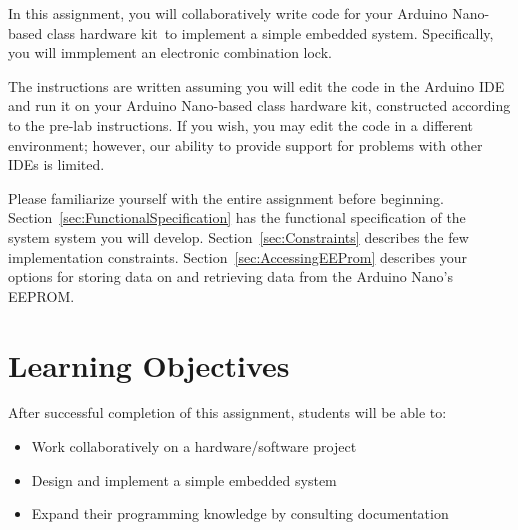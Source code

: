 

\usepackage{enumitem}
\usepackage{addfont}




\renewcommand{\labnumber}{10}
\renewcommand{\labname}{Implementing an Electronic Combination Lock}
\renewcommand{\shortlabname}{combolock -- grouplab}
\renewcommand{\collaborationrules}{\teameffort}
\renewcommand{\duedate}{Week of May 2, Before the start of your lab section\footnote{See Piazza for the due dates of teams with students from different lab sections.}}
\newcommand{\nano}{Arduino Nano}
\renewcommand{\runtimeenvironment}{your \nano-based class hardware kit}

\startdocument

In this assignment, you will collaboratively write code for \runtimeenvironment\
to implement a simple embedded system. Specifically, you will immplement an
electronic combination lock.

The instructions are written assuming you will edit the code in the Arduino IDE
and run it on \runtimeenvironment, constructed according to the pre-lab
instructions. If you wish, you may edit the code in a different environment;
however, our ability to provide support for problems with other IDEs is limited.

Please familiarize yourself with the entire assignment before beginning.
Section~\ref{sec:FunctionalSpecification} has the functional specification of
the system system you will develop. Section~\ref{sec:Constraints} describes
the few implementation constraints. Section~\ref{sec:AccessingEEProm} describes
your options for storing data on and retrieving data from the \nano's EEPROM.

\section*{Learning Objectives}

After successful completion of this assignment, students will be able to:
\begin{itemize}
\item Work collaboratively on a hardware/software project
\item Design and implement a simple embedded system
\item Expand their programming knowledge by consulting documentation
\end{itemize}

